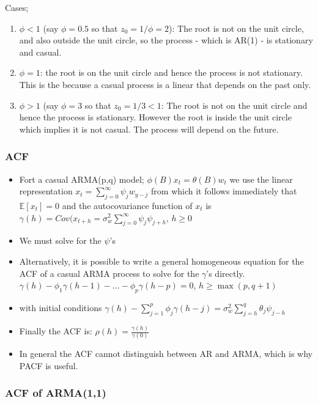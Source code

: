 \documentclass{article}
\begin{document}
 Cases;
\begin{enumerate}
    \item $\phi < 1$ (say $\phi = 0.5$ so that $z_0 = 1/\phi = 2$): The root is not on the unit circle, and also outside the unit circle, so the process - which is AR(1) - is stationary and casual.
    \item $\phi = 1$: the root is on the unit circle and hence the process is not stationary. This is the because a casual process is a linear that depends on the past only.
    \item $\phi > 1$ (say $\phi = 3$ so that $z_0 = 1/3 < 1$: The root is not on the unit circle and hence the process is stationary. However the root is inside the unit circle which implies it is not casual. The process will depend on the future.
\end{enumerate}



\subsubsection{ACF}
\begin{itemize}
    \item Fort a casual ARMA(p,q) model; $\phi(B) x_t = \theta(B) w_t$ we use the linear representation $x_t = \sum_{j=0}^\infty \psi_j w_{y-j}$ from which it follows immediately that $\mathbb{E}[x_t] = 0$ and the autocovariance function of $x_t$ is\\
    $\gamma(h) = Cov(x_{t+h} = \sigma^2_w \sum_{j=0}^\infty \psi_j \psi_{j+h}$, $h \geq 0$
    \item We must solve for the $\psi$'s
    \item Alternatively, it is possible to write a general homogeneous equation for the ACF of a casual ARMA process to solve for the $\gamma$'s directly.
    \subitem $\gamma(h) - \phi_1 \gamma(h-1) - ... - \phi_p \gamma(h-p) = 0$, $h \geq \max(p,q+1)$
    \item with initial conditions
    \subitem $\gamma(h) - \sum_{j=1}^p \phi_j \gamma(h-j) = \sigma^2_w \sum_{j=h}^q \theta_j \psi_{j-h}$
    \item Finally the ACF is: $\rho(h) = \frac{\gamma(h)}{\gamma(0)}$
    \item In general the ACF cannot distinguish between AR and ARMA, which is why PACF is useful.
\end{itemize}


\subsubsection{ACF of ARMA(1,1)}
\end{document}

